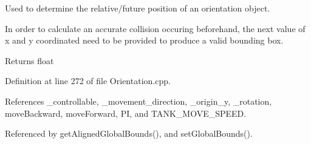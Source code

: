 Used to determine the relative/future position of an orientation object. 

In order to calculate an accurate collision occuring beforehand, the next value of x and y coordinated need to be provided to produce a valid bounding box. \begin{DoxyReturn}{Returns}
float 
\end{DoxyReturn}


Definition at line 272 of file Orientation.\-cpp.



References \-\_\-controllable, \-\_\-movement\-\_\-direction, \-\_\-origin\-\_\-y, \-\_\-rotation, move\-Backward, move\-Forward, P\-I, and T\-A\-N\-K\-\_\-\-M\-O\-V\-E\-\_\-\-S\-P\-E\-E\-D.



Referenced by get\-Aligned\-Global\-Bounds(), and set\-Global\-Bounds().


